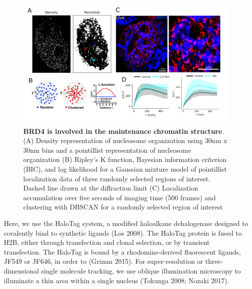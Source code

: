 \documentclass{ucetd}
\begin{document}
\begin{figure}
\begin{center}
\includegraphics[width=16cm]{BRD4-Results.png}
\end{center}
\caption{\textbf{BRD4 is involved in the maintenance chromatin structure}. (A) Density representation of nucleosome organization using 30nm x 30nm bins and a pointillist representation of nucleosome organization (B) Ripley's K function, Bayesian information criterion (BIC), and log likelihood for a Gaussian mixture model of pointillist localization data of three randomly selected regions of interest. Dashed line drawn at the diffraction limit (C) Localization accumulation over five seconds of imaging time (500 frames) and clustering with DBSCAN for a randomly selected region of interest}
\end{figure}

Here, we use the HaloTag system, a modified haloalkane dehalogenase designed to covalently bind to synthetic ligands  (Los 2008). The HaloTag protein is fused to H2B, either through transfection and clonal selection, or by transient transfection. The HaloTag is bound by a rhodomine-derived fluorescent ligands, JF549 or JF646, in order to (Grimm 2015). For super-resolution or three-dimensional single molecule tracking, we use oblique illumination microscopy to illuminate a thin area within a single nucleus (Tokunga 2008; Nozaki 2017). 
\end{document}
